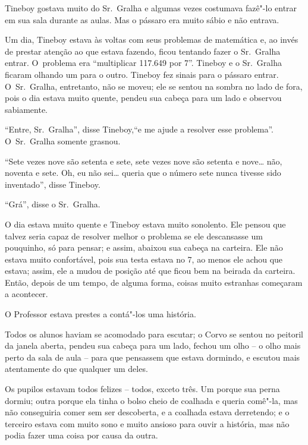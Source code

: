 

Tineboy gostava muito do Sr.~Gralha e algumas vezes costumava fazê"-lo
entrar em sua sala durante as aulas. Mas o pássaro era muito sábio e não
entrava.

Um dia, Tineboy estava às voltas com seus problemas de matemática e, ao
invés de prestar atenção ao que estava fazendo, ficou tentando fazer o
Sr.~Gralha entrar. O~problema era ``multiplicar 117.649 por 7''. Tineboy
e o Sr.~Gralha ficaram olhando um para o outro. Tineboy fez sinais para
o pássaro entrar. O~Sr.~Gralha, entretanto, não se moveu; ele se sentou
na sombra no lado de fora, pois o dia estava muito quente, pendeu sua
cabeça para um lado e observou sabiamente.

``Entre, Sr.~Gralha'', disse Tineboy,``e me ajude a resolver esse
problema''. O~Sr.~Gralha somente grasnou.

``Sete vezes nove são setenta e sete, sete vezes nove são setenta e
nove… não, noventa e sete. Oh, eu não sei… queria que o
número sete nunca tivesse sido inventado'', disse Tineboy.

``Grá'', disse o Sr.~Gralha.

O dia estava muito quente e Tineboy estava muito sonolento. Ele pensou
que talvez seria capaz de resolver melhor o problema se ele descansasse
um pouquinho, só para pensar; e assim, abaixou sua cabeça na carteira.
Ele não estava muito confortável, pois sua testa estava no 7, ao menos
ele achou que estava; assim, ele a mudou de posição até que ficou bem na
beirada da carteira. Então, depois de um tempo, de alguma forma, coisas
muito estranhas começaram a acontecer.

O Professor estava prestes a contá"-los uma história.

Todos os alunos haviam se acomodado para escutar; o Corvo se sentou no
peitoril da janela aberta, pendeu sua cabeça para um lado, fechou um
olho -- o olho mais perto da sala de aula -- para que pensassem que
estava dormindo, e escutou mais atentamente do que qualquer um deles.


Os pupilos estavam todos felizes -- todos, exceto três. Um porque sua
perna dormiu; outra porque ela tinha o bolso cheio de coalhada e queria
comê"-la, mas não conseguiria comer sem ser descoberta, e a coalhada
estava derretendo; e o terceiro estava com muito sono e muito ansioso
para ouvir a história, mas não podia fazer uma coisa por causa da outra.

